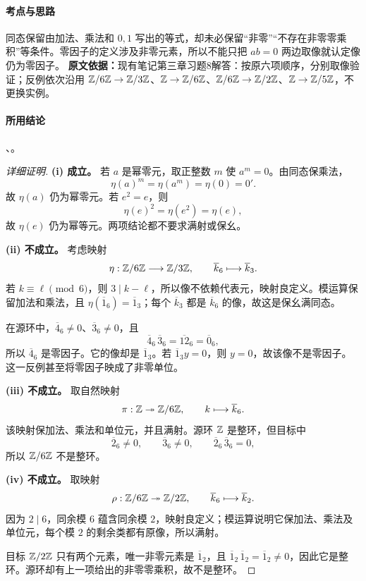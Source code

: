 \paragraph{考点与思路}
同态保留由加法、乘法和 $0,1$ 写出的等式，却未必保留“非零”“不存在非零零乘积”等条件。零因子的定义涉及非零元素，所以不能只把 $ab=0$ 两边取像就认定像仍为零因子。
\textbf{原文依据：}现有笔记第三章习题8解答：按原六项顺序，分别取像验证；反例依次沿用 $\mathbb Z/6\mathbb Z\to\mathbb Z/3\mathbb Z$、$\mathbb Z\to\mathbb Z/6\mathbb Z$、$\mathbb Z/6\mathbb Z\to\mathbb Z/2\mathbb Z$、$\mathbb Z\to\mathbb Z/5\mathbb Z$，不更换实例。

\paragraph{所用结论}、。
\begin{proof}[详细证明]
\textbf{(i) 成立。}
若 $a$ 是幂零元，取正整数 $m$ 使 $a^m=0$。由同态保乘法，
\[
\eta(a)^m=\eta(a^m)=\eta(0)=0'.
\]
故 $\eta(a)$ 仍为幂零元。若 $e^2=e$，则
\[
\eta(e)^2=\eta(e^2)=\eta(e),
\]
故 $\eta(e)$ 仍为幂等元。两项结论都不要求满射或保幺。

\textbf{(ii) 不成立。}
考虑映射
\[
\eta:\mathbb Z/6\mathbb Z\longrightarrow\mathbb Z/3\mathbb Z,\qquad
\overline{k}_{6}\longmapsto\overline{k}_{3}.
\]
若 $k\equiv\ell\pmod6$，则 $3\mid k-\ell$，所以像不依赖代表元，映射良定义。模运算保留加法和乘法，且 $\eta(\overline1_6)=\overline1_3$；每个 $\overline{k}_3$ 都是 $\overline{k}_6$ 的像，故这是保幺满同态。

在源环中，$\overline4_6\ne0$、$\overline3_6\ne0$，且
\[
\overline4_6\,\overline3_6=\overline{12}_6=\overline0_6,
\]
所以 $\overline4_6$ 是零因子。它的像却是 $\overline1_3$。若 $\overline1_3 y=0$，则 $y=0$，故该像不是零因子。这一反例甚至将零因子映成了非零单位。

\textbf{(iii) 不成立。}
取自然映射
\[
\pi:\mathbb Z\twoheadrightarrow\mathbb Z/6\mathbb Z,\qquad k\longmapsto\overline{k}_6.
\]
该映射保加法、乘法和单位元，并且满射。源环 $\mathbb Z$ 是整环，但目标中
\[
\overline2_6\ne0,\qquad \overline3_6\ne0,\qquad
\overline2_6\,\overline3_6=0,
\]
所以 $\mathbb Z/6\mathbb Z$ 不是整环。

\textbf{(iv) 不成立。}
取映射
\[
\rho:\mathbb Z/6\mathbb Z\twoheadrightarrow\mathbb Z/2\mathbb Z,\qquad
\overline{k}_{6}\longmapsto\overline{k}_{2}.
\]
因为 $2\mid6$，同余模 $6$ 蕴含同余模 $2$，映射良定义；模运算说明它保加法、乘法及单位元，每个模 $2$ 的剩余类都有原像，所以满射。

目标 $\mathbb Z/2\mathbb Z$ 只有两个元素，唯一非零元素是 $\overline1_2$，且 $\overline1_2\,\overline1_2=\overline1_2\ne0$，因此它是整环。源环却有上一项给出的非零零乘积，故不是整环。


\end{proof}

